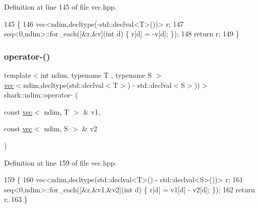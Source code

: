 Definition at line 145 of file vec.\+hpp.


\begin{DoxyCode}
145                                                                                     \{
146             vec<ndim,decltype(-std::declval<T>())> r;
147             seq<0,ndim>::for\_each([&r,&v](\textcolor{keywordtype}{int} d) \{ r[d] = -v[d]; \});
148             \textcolor{keywordflow}{return} r;
149         \}
\end{DoxyCode}
\hypertarget{namespaceshark_1_1ndim_af88fbc3e98ec442203c618c61ce65a87}{}\label{namespaceshark_1_1ndim_af88fbc3e98ec442203c618c61ce65a87} 
\subsubsection{\texorpdfstring{operator-\/()}{operator-()}\hspace{0.1cm}{\footnotesize\ttfamily [4/8]}}
{\footnotesize\ttfamily template$<$int ndim, typename T , typename S $>$ \\
\hyperlink{structshark_1_1ndim_1_1vec}{vec}$<$ndim,decltype(std\+::declval$<$T$>$) -\/ std\+::declval$<$S$>$))$>$ shark\+::ndim\+::operator-\/ (\begin{DoxyParamCaption}\item[{const \hyperlink{structshark_1_1ndim_1_1vec}{vec}$<$ ndim, T $>$ \&}]{v1,  }\item[{const \hyperlink{structshark_1_1ndim_1_1vec}{vec}$<$ ndim, S $>$ \&}]{v2 }\end{DoxyParamCaption})\hspace{0.3cm}{\ttfamily [inline]}}



Definition at line 159 of file vec.\+hpp.


\begin{DoxyCode}
159                                                                                                            
                        \{
160             vec<ndim,decltype(std::declval<T>() - std::declval<S>())> r;
161             seq<0,ndim>::for\_each([&r,&v1,&v2](\textcolor{keywordtype}{int} d) \{ r[d] = v1[d] - v2[d]; \});
162             \textcolor{keywordflow}{return} r;
163         \}
\end{DoxyCode}
\hypertarget{namespaceshark_1_1ndim_a7a89208e5b1e8bfe1486d3c44f0f4380}{}\label{namespaceshark_1_1ndim_a7a89208e5b1e8bfe1486d3c44f0f4380} 

